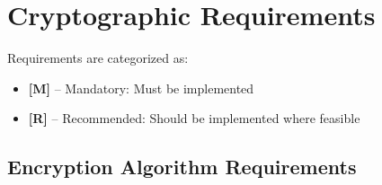 \documentclass[11pt,letterpaper]{article}
\begin{document}
\section{Cryptographic Requirements}

Requirements are categorized as:
\begin{itemize}[topsep=4pt, itemsep=2pt]
    \item \textcolor{mandatory}{\textbf{[M]}} -- Mandatory: Must be implemented
    \item \textcolor{recommended}{\textbf{[R]}} -- Recommended: Should be implemented where feasible
\end{itemize}

\subsection{Encryption Algorithm Requirements}
\end{document}
